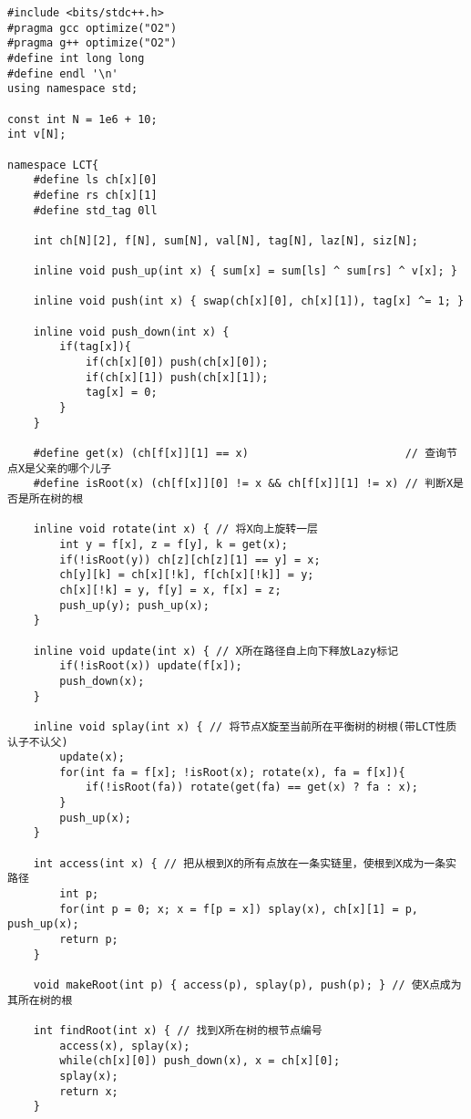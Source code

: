 \documentclass[]{article}
\begin{document}
\begin{verbatim}
#include <bits/stdc++.h>
#pragma gcc optimize("O2")
#pragma g++ optimize("O2")
#define int long long
#define endl '\n'
using namespace std;

const int N = 1e6 + 10;
int v[N];

namespace LCT{
    #define ls ch[x][0]
    #define rs ch[x][1]
    #define std_tag 0ll

    int ch[N][2], f[N], sum[N], val[N], tag[N], laz[N], siz[N];

    inline void push_up(int x) { sum[x] = sum[ls] ^ sum[rs] ^ v[x]; }
    
    inline void push(int x) { swap(ch[x][0], ch[x][1]), tag[x] ^= 1; }

    inline void push_down(int x) {
        if(tag[x]){
            if(ch[x][0]) push(ch[x][0]);
            if(ch[x][1]) push(ch[x][1]);
            tag[x] = 0; 
        } 
    }

    #define get(x) (ch[f[x]][1] == x)                        // 查询节点X是父亲的哪个儿子
    #define isRoot(x) (ch[f[x]][0] != x && ch[f[x]][1] != x) // 判断X是否是所在树的根

    inline void rotate(int x) { // 将X向上旋转一层
        int y = f[x], z = f[y], k = get(x);
        if(!isRoot(y)) ch[z][ch[z][1] == y] = x;
        ch[y][k] = ch[x][!k], f[ch[x][!k]] = y;
        ch[x][!k] = y, f[y] = x, f[x] = z;
        push_up(y); push_up(x);
    }

    inline void update(int x) { // X所在路径自上向下释放Lazy标记
        if(!isRoot(x)) update(f[x]);
        push_down(x);
    }

    inline void splay(int x) { // 将节点X旋至当前所在平衡树的树根(带LCT性质认子不认父)
        update(x);
        for(int fa = f[x]; !isRoot(x); rotate(x), fa = f[x]){
            if(!isRoot(fa)) rotate(get(fa) == get(x) ? fa : x);
        }
        push_up(x);
    }

    int access(int x) { // 把从根到X的所有点放在一条实链里，使根到X成为一条实路径
        int p;
        for(int p = 0; x; x = f[p = x]) splay(x), ch[x][1] = p, push_up(x);
        return p;
    }

    void makeRoot(int p) { access(p), splay(p), push(p); } // 使X点成为其所在树的根

    int findRoot(int x) { // 找到X所在树的根节点编号
        access(x), splay(x);
        while(ch[x][0]) push_down(x), x = ch[x][0];
        splay(x);
        return x;
    }


\end{verbatim}
\end{document}
